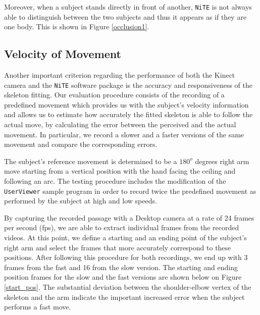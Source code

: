 \documentclass[10pt,a4paper]{article}
\begin{document}
\noindent
Moreover, when a subject stands directly in front of another, \texttt{NiTE} is not always able to distinguish between the two subjects and thus it appears as if they are one body. This is shown in Figure \ref{occlusion1}.

\subsection{Velocity of Movement}
Another important criterion regarding the performance of both the Kinect camera and the \texttt{NiTE} software package is the accuracy and responsiveness of the skeleton fitting. Our evaluation procedure consists of the recording of a predefined movement which provides us with the subject's velocity information and allows us to estimate how accurately the fitted skeleton is able to follow the actual move, by calculating the error between the perceived and the actual movement. In particular, we record a slower and a faster versions of the same movement and compare the corresponding errors.

\noindent
The subject's reference movement is determined to be a $180^o$ degrees right arm move starting from a vertical position with the hand facing the ceiling and following an arc. The testing procedure includes the modification of the \texttt{UserViewer} sample program in order to record twice the predefined movement as performed by the subject at high and low speeds. 
 
\noindent
By capturing the recorded passage with a Desktop camera at a rate of 24 frames per second (fps), we are able to extract individual frames from the recorded videos. At this point, we define a starting and an ending point of the subject's right arm and select the frames that more accurately correspond to these positions. After following this procedure for both recordings, we end up with 3 frames from the fast and 16 from the slow version. The starting and ending position frames for the slow and the fast versions are shown below on Figure \ref{start_pos}. The substantial deviation between the shoulder-elbow vertex of the skeleton and the arm indicate the important increased error when the subject performs a fast move.
\end{document}
